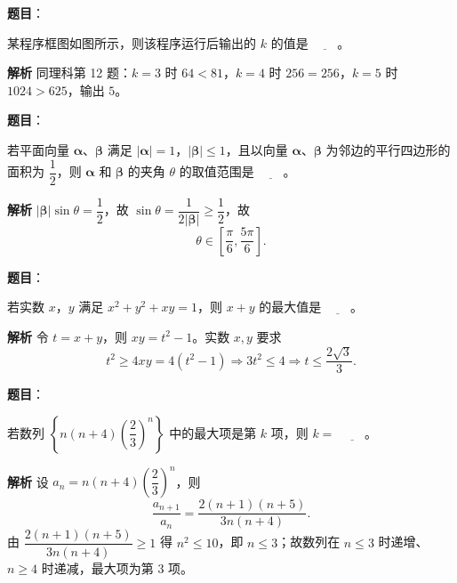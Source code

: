 \begin{answer}

\textbf{题目}：

某程序框图如图所示，则该程序运行后输出的 $k$ 的值是 $\underline{\qquad}$。
\nopagebreak[4]
\begin{center}\end{center}
\nopagebreak[4]
\textbf{解析}
同理科第 12 题：$k=3$ 时 $64<81$，$k=4$ 时 $256=256$，$k=5$ 时 $1024>625$，输出 $5$。


\end{answer}
\begin{answer}

\textbf{题目}：

若平面向量 $\boldsymbol\alpha$、$\boldsymbol\beta$ 满足 $|\boldsymbol\alpha|=1$，$|\boldsymbol\beta|\leqslant1$，且以向量 $\boldsymbol\alpha$、$\boldsymbol\beta$ 为邻边的平行四边形的面积为 $\dfrac12$，则 $\boldsymbol\alpha$ 和 $\boldsymbol\beta$ 的夹角 $\theta$ 的取值范围是 $\underline{\qquad}$。

\textbf{解析}
$|\boldsymbol\beta|\sin\theta=\dfrac12$，故 $\sin\theta=\dfrac1{2|\boldsymbol\beta|}\geqslant\dfrac12$，故
\nopagebreak[4]
\[\theta\in\left[\frac\pi6,\frac{5\pi}6\right].\]


\end{answer}
\begin{answer}

\textbf{题目}：

若实数 $x$，$y$ 满足 $x^2+y^2+xy=1$，则 $x+y$ 的最大值是 $\underline{\qquad}$。

\textbf{解析}
令 $t=x+y$，则 $xy=t^2-1$。实数 $x,y$ 要求
\nopagebreak[4]
\[t^2\geqslant4xy=4(t^2-1)\Longrightarrow3t^2\leqslant4\Longrightarrow t\leqslant\frac{2\sqrt3}3.\]


\end{answer}
\begin{answer}

\textbf{题目}：

若数列 $\left\{n(n+4)\left(\dfrac23\right)^n\right\}$ 中的最大项是第 $k$ 项，则 $k=$ $\underline{\qquad}$。

\textbf{解析}
设 $a_n=n(n+4)\left(\dfrac23\right)^n$，则
\nopagebreak[4]
\[\frac{a_{n+1}}{a_n}=\frac{2(n+1)(n+5)}{3n(n+4)}.\]
由 $\dfrac{2(n+1)(n+5)}{3n(n+4)}\geqslant1$ 得 $n^2\leqslant10$，即 $n\leqslant3$；故数列在 $n\leqslant3$ 时递增、$n\geqslant4$ 时递减，最大项为第 $3$ 项。


\end{answer}
